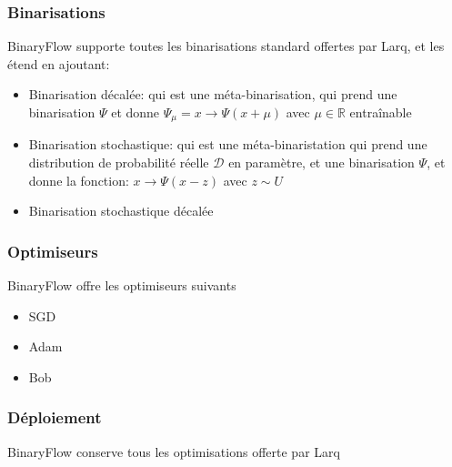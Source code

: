 \subsubsection{Binarisations}
BinaryFlow supporte toutes les binarisations standard offertes par Larq, et les étend en ajoutant:
\begin{itemize}
	\item Binarisation décalée: qui est une méta-binarisation, qui prend une binarisation $\Psi$ et donne $\Psi_\mu=x\rightarrow \Psi(x+\mu)$ avec $\mu \in\mathbb{R}$ entraînable
	\item Binarisation stochastique: qui est une méta-binaristation qui prend une distribution de probabilité réelle $\mathcal{D}$ en paramètre, et une binarisation $\Psi$, et donne la fonction: $x\rightarrow  \Psi(x-z)$ avec $z\sim U$
	\item Binarisation stochastique décalée
	
\end{itemize}
\subsubsection{Optimiseurs}
BinaryFlow offre les optimiseurs suivants
\begin{itemize}
	\item SGD
	\item Adam\cite{AdamOptimizer}
	\item Bob\cite{BopOptimizer}
\end{itemize}
\subsubsection{Déploiement}
BinaryFlow conserve tous les optimisations offerte par Larq